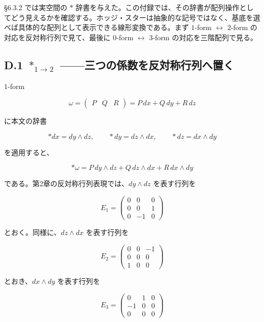\documentclass[a4paper,12pt,openany]{book}
\begin{document}
§6.3.2 では実空間の \(\ast\)
辞書を与えた。この付録では、その辞書が配列操作としてどう見えるかを確認する。ホッジ・スターは抽象的な記号ではなく、基底を選べば具体的な配列として表示できる線形変換である。まず
\(1\)-form \(\leftrightarrow\) \(2\)-form
の対応を反対称行列で見て、最後に \(0\)-form \(\leftrightarrow\)
\(3\)-form の対応を三階配列で見る。

\hypertarget{d.1-ast_1to2-ux4e09ux3064ux306eux4fc2ux6570ux3092ux53cdux5bfeux79f0ux884cux5217ux3078ux7f6eux304f}{%
\subsection*{\texorpdfstring{D.1 \(\ast_{1\to2}\)
——三つの係数を反対称行列へ置く}{D.1 \textbackslash ast\_\{1\textbackslash to2\} ——三つの係数を反対称行列へ置く}}\label{d.1-ast_1to2-ux4e09ux3064ux306eux4fc2ux6570ux3092ux53cdux5bfeux79f0ux884cux5217ux3078ux7f6eux304f}}

\(1\)-form

\[
\omega =
\begin{pmatrix}P & Q & R\end{pmatrix}
=
P\,dx + Q\,dy + R\,dz
\]

に本文の辞書

\[
\ast dx = dy \wedge dz,\qquad
\ast dy = dz \wedge dx,\qquad
\ast dz = dx \wedge dy
\]

を適用すると、

\[
\ast\omega
=
P\,dy\wedge dz
+
Q\,dz\wedge dx
+
R\,dx\wedge dy
\]

である。第2章の反対称行列表現では、\(dy\wedge dz\) を表す行列を

\[
E_1 =
\begin{pmatrix}
0 & 0 & 0 \\
0 & 0 & 1 \\
0 & -1 & 0
\end{pmatrix}
\]

とおく。同様に、\(dz\wedge dx\) を表す行列を

\[
E_2 =
\begin{pmatrix}
0 & 0 & -1 \\
0 & 0 & 0 \\
1 & 0 & 0
\end{pmatrix}
\]

とおき、\(dx\wedge dy\) を表す行列を

\[
E_3 =
\begin{pmatrix}
0 & 1 & 0 \\
-1 & 0 & 0 \\
0 & 0 & 0
\end{pmatrix}
\]
\end{document}
